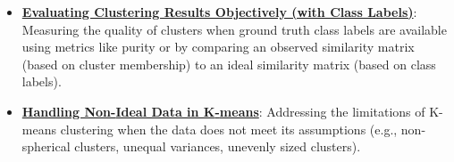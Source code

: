 \documentclass{article}%
\begin{document}
\begin{itemize}[leftmargin=*]
\item \href{https://purdue.brightspace.com/d2l/common/assets/pdfjs-d2l-dist/1.0.14-legacy/web/viewer.html?file=\%2Fcontent\%2Fenforced\%2F1095467-wl.202510.CS.24300.001\%2F12L2-distance-clusters.pdf\%3Fou\%3D1095467\&lang=en-us\&container=d2l-fileviewer-rendered-pdf\&fullscreen=d2l-fileviewer-rendered-pdf-dialog\&height=667#page=44}{\textbf{Evaluating Clustering Results Objectively (with Class Labels)}}: Measuring the quality of clusters when ground truth class labels are available using metrics like purity or by comparing an observed similarity matrix (based on cluster membership) to an ideal similarity matrix (based on class labels).%
\item \href{https://purdue.brightspace.com/d2l/common/assets/pdfjs-d2l-dist/1.0.14-legacy/web/viewer.html?file=\%2Fcontent\%2Fenforced\%2F1095467-wl.202510.CS.24300.001\%2F12L2-distance-clusters.pdf\%3Fou\%3D1095467\&lang=en-us\&container=d2l-fileviewer-rendered-pdf\&fullscreen=d2l-fileviewer-rendered-pdf-dialog\&height=667#page=35}{\textbf{Handling Non{-}Ideal Data in K{-}means}}: Addressing the limitations of K-means clustering when the data does not meet its assumptions (e.g., non-spherical clusters, unequal variances, unevenly sized clusters).%
\end{itemize}%
\end{document}
